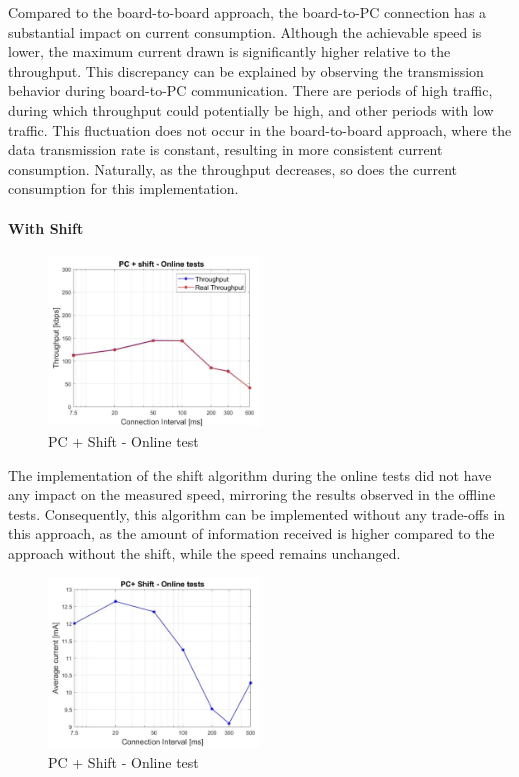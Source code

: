 \documentclass{Configuration_Files/PoliMi3i_thesis}
\begin{document}
Compared to the board-to-board approach, the board-to-PC connection has a substantial impact on current consumption. Although the achievable speed is lower, the maximum current drawn is significantly higher relative to the throughput. This discrepancy can be explained by observing the transmission behavior during board-to-PC communication. There are periods of high traffic, during which throughput could potentially be high, and other periods with low traffic. This fluctuation does not occur in the board-to-board approach, where the data transmission rate is constant, resulting in more consistent current consumption. Naturally, as the throughput decreases, so does the current consumption for this implementation.

\paragraph{With Shift}

\begin{figure}[H]
    \centering
    \includegraphics[width=0.5\textwidth]{Results Manuel/figure37}
    \caption{PC + Shift - Online test}
    \label{manuel_results_37}
\end{figure}

The implementation of the shift algorithm during the online tests did not have any impact on the measured speed, mirroring the results observed in the offline tests. Consequently, this algorithm can be implemented without any trade-offs in this approach, as the amount of information received is higher compared to the approach without the shift, while the speed remains unchanged.

\begin{figure}[H]
    \centering
    \includegraphics[width=0.5\textwidth]{Results Manuel/figure38}
    \caption{PC + Shift - Online test}
    \label{manuel_results_38}
\end{figure}
\end{document}
